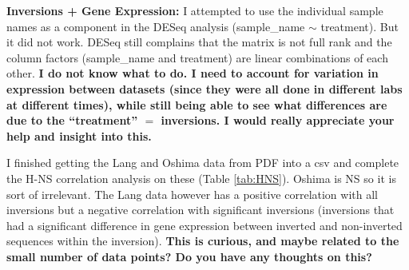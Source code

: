 \documentclass[12pt]{article}
\begin{document}
\bigskip

\textbf{Inversions + Gene Expression:}
I attempted to use the individual sample names as a component in the DESeq analysis (sample\_name $\sim$ treatment).
But it did not work. DESeq still complains that the matrix is not full rank and the column factors (sample\_name and treatment) are linear combinations of each other.
\textbf{I do not know what to do. I need to account for variation in expression between datasets (since they were all done in different labs at different times), while still being able to see what differences are due to the ``treatment'' $=$ inversions. I would really appreciate your help and insight into this.}
 
I finished getting the Lang and Oshima data from PDF into a csv and complete the H-NS correlation analysis on these (Table \ref{tab:HNS}).
Oshima is NS so it is sort of irrelevant.
The Lang data however has a positive correlation with all inversions but a negative correlation with significant inversions (inversions that had a significant difference in gene expression between inverted and non-inverted sequences within the inversion).
\textbf{This is curious, and maybe related to the small number of data points? Do you have any thoughts on this?}
% 
\end{document}
